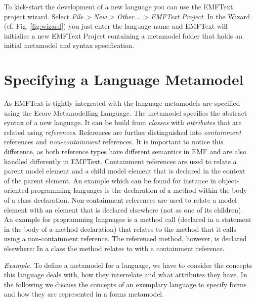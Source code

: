 	

	To kick-start the development of a new language you can use the EMFText project
	wizard. Select \emph{File > New > Other... > EMFText Project}. In the Wizard
	(cf. Fig. \ref{fig:wizard}) you just enter the language name and EMFText
	will initialise a new EMFText Project containing a metamodel folder that
	holds an initial metamodel and syntax specification.

\section{Specifying a Language Metamodel}

	As EMFText is tightly integrated with the \EMF language metamodels are
	specified using the Ecore Metamodelling Language. The metamodel specifies the abstract
	syntax of a new language. It can be build from \emph{classes} with
	\emph{attributes} that are related using \emph{references}. References are
	further distinguished into \emph{containment} references and
	\emph{non-containment} references. It is important to notice this difference,
	as both reference types have different semantics in EMF and are also handled
	differently in EMFText. Containment references are used to relate a parent model element and a
	child model element that is declared in the context of the parent element. An
	example which can be found for instance in object-oriented programming
	languages is the declaration of a method within the body of a class declaration. Non-containment
	references are used to relate a model element with an element that is declared
	elsewhere (not as one of its children). An example for programming languages is
	a method call (declared in a statement in the body of a method declaration) that
	relates to the method that it calls using a non-containment reference. The
	referenced method, however, is declared elsewhere: In a class the method
	relates to with a containment reference. 

		\emph{Example.} 
		To define a metamodel for a language, we have to consider the
		concepts this language deals with, how they interrelate and what attributes they
		have. In the following we discuss the concepts of an exemplary language to
		specify forms and how they are represented in a forms metamodel.
		
